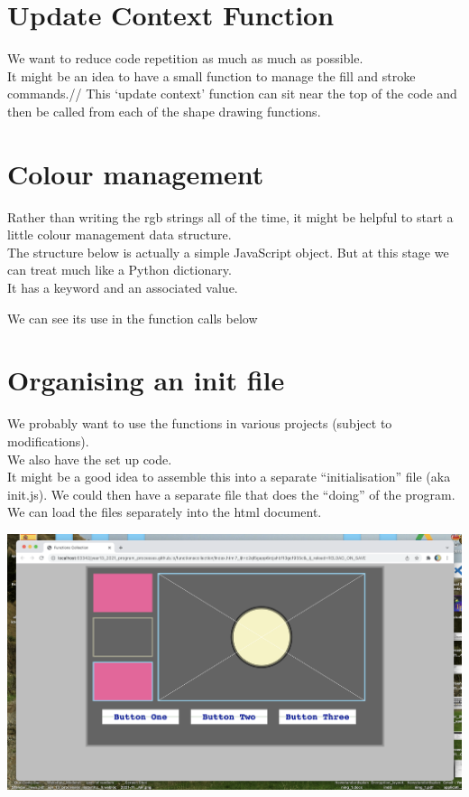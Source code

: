 \documentclass[a4paper,12pt]{article}
\begin{document}
\section{Update Context Function}
We want to reduce code repetition as much as much as possible.\\
It might be an idea to have a small function to manage the fill and stroke commands.//
This `update context' function can sit near the top of the code and then be called from each of the shape drawing functions.

\newpage
\section{Colour management}
Rather than writing the rgb strings all of the time, it might be helpful to start a little colour management data structure.\\
The structure below is actually a simple JavaScript object. But at this stage we can treat much like a Python dictionary.\\
It has a keyword and an associated value.


We can see its use in the function calls below

\newpage

\section{Organising an init file}
We probably want to use the functions in various projects (subject to modifications).\\
We also have the set up code.\\
It might be a good idea to assemble this into a separate ``initialisation'' file (aka init.js).
We could then have a separate file that does the ``doing'' of the program.
We can load the files separately into the html document.



\begin{center}
\includegraphics[width=18cm, angle=0, origin=c]{functionscollection/littleinterface.png}
\end{center}
\newpage
\end{document}

